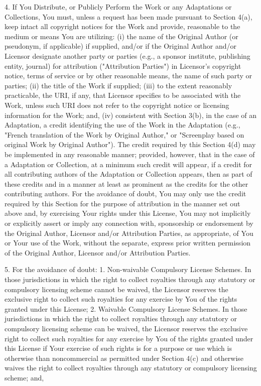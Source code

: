 4. If You Distribute, or Publicly Perform the Work or any
Adaptations or Collections, You must, unless a request has been
made pursuant to Section 4(a), keep intact all copyright notices
for the Work and provide, reasonable to the medium or means You are
utilizing: (i) the name of the Original Author (or pseudonym, if
applicable) if supplied, and/or if the Original Author and/or
Licensor designate another party or parties (e.g., a sponsor
institute, publishing entity, journal) for attribution
("Attribution Parties") in Licensor's copyright notice, terms of
service or by other reasonable means, the name of such party or
parties; (ii) the title of the Work if supplied; (iii) to the
extent reasonably practicable, the URI, if any, that Licensor
specifies to be associated with the Work, unless such URI does not
refer to the copyright notice or licensing information for the
Work; and, (iv) consistent with Section 3(b), in the case of an
Adaptation, a credit identifying the use of the Work in the
Adaptation (e.g., "French translation of the Work by Original
Author," or "Screenplay based on original Work by Original
Author"). The credit required by this Section 4(d) may be
implemented in any reasonable manner; provided, however, that in
the case of a Adaptation or Collection, at a minimum such credit
will appear, if a credit for all contributing authors of the
Adaptation or Collection appears, then as part of these credits and
in a manner at least as prominent as the credits for the other
contributing authors. For the avoidance of doubt, You may only use
the credit required by this Section for the purpose of attribution
in the manner set out above and, by exercising Your rights under
this License, You may not implicitly or explicitly assert or imply
any connection with, sponsorship or endorsement by the Original
Author, Licensor and/or Attribution Parties, as appropriate, of You
or Your use of the Work, without the separate, express prior
written permission of the Original Author, Licensor and/or
Attribution Parties.

5. For the avoidance of doubt: 1. Non-waivable Compulsory License
Schemes. In those jurisdictions in which the right to collect
royalties through any statutory or compulsory licensing scheme
cannot be waived, the Licensor reserves the exclusive right to
collect such royalties for any exercise by You of the rights
granted under this License; 2. Waivable Compulsory License Schemes.
In those jurisdictions in which the right to collect royalties
through any statutory or compulsory licensing scheme can be waived,
the Licensor reserves the exclusive right to collect such royalties
for any exercise by You of the rights granted under this License if
Your exercise of such rights is for a purpose or use which is
otherwise than noncommercial as permitted under Section 4(c) and
otherwise waives the right to collect royalties through any
statutory or compulsory licensing scheme; and,

